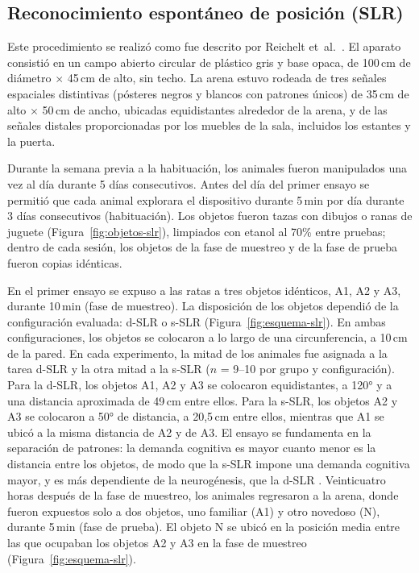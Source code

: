 \FloatBarrier
\subsection{Reconocimiento espontáneo de posición (SLR)}\label{sec:slr}

Este procedimiento se realizó como fue descrito por Reichelt et~al.\ \cite{reichelt2016sucrose,reichelt2021slr}. El aparato consistió en un campo abierto circular de plástico gris y base opaca, de 100\,cm de diámetro $\times$ 45\,cm de alto, sin techo. La arena estuvo rodeada de tres señales espaciales distintivas (pósteres negros y blancos con patrones únicos) de 35\,cm de alto $\times$ 50\,cm de ancho, ubicadas equidistantes alrededor de la arena, y de las señales distales proporcionadas por los muebles de la sala, incluidos los estantes y la puerta.

Durante la semana previa a la habituación, los animales fueron manipulados una vez al día durante 5 días consecutivos. Antes del día del primer ensayo se permitió que cada animal explorara el dispositivo durante 5\,min por día durante 3 días consecutivos (habituación). Los objetos fueron tazas con dibujos o ranas de juguete (Figura~\ref{fig:objetos-slr}), limpiados con etanol al 70\% entre pruebas; dentro de cada sesión, los objetos de la fase de muestreo y de la fase de prueba fueron copias idénticas.

En el primer ensayo se expuso a las ratas a tres objetos idénticos, A1, A2 y A3, durante 10\,min (fase de muestreo). La disposición de los objetos dependió de la configuración evaluada: d-SLR o s-SLR (Figura~\ref{fig:esquema-slr}). En ambas configuraciones, los objetos se colocaron a lo largo de una circunferencia, a 10\,cm de la pared. En cada experimento, la mitad de los animales fue asignada a la tarea d-SLR y la otra mitad a la s-SLR ($n$ = 9--10 por grupo y configuración). Para la d-SLR, los objetos A1, A2 y A3 se colocaron equidistantes, a 120° y a una distancia aproximada de 49\,cm entre ellos. Para la s-SLR, los objetos A2 y A3 se colocaron a 50° de distancia, a 20,5\,cm entre ellos, mientras que A1 se ubicó a la misma distancia de A2 y de A3. El ensayo se fundamenta en la separación de patrones: la demanda cognitiva es mayor cuanto menor es la distancia entre los objetos, de modo que la s-SLR impone una demanda cognitiva mayor, y es más dependiente de la neurogénesis, que la d-SLR \cite{reichelt2021slr}. Veinticuatro horas después de la fase de muestreo, los animales regresaron a la arena, donde fueron expuestos solo a dos objetos, uno familiar (A1) y otro novedoso (N), durante 5\,min (fase de prueba). El objeto N se ubicó en la posición media entre las que ocupaban los objetos A2 y A3 en la fase de muestreo (Figura~\ref{fig:esquema-slr}).

